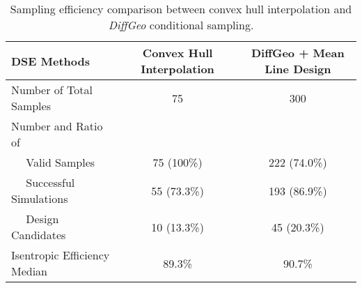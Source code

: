 \begin{table}[htbp]
  \centering
  \caption{Sampling efficiency comparison between convex hull interpolation and \textit{DiffGeo} conditional sampling.}
    \begin{tabular}{lcc}
    \hline
    DSE Methods & Convex Hull Interpolation & DiffGeo + Mean Line Design \\
    \hline
    Number of Total Samples & 75     & 300 \\
    \hline
    Number and Ratio of  &        &   \\
    $\quad$ Valid Samples & 75 (100\%) & 222 (74.0\%) \\
    $\quad$ Successful Simulations & 55 (73.3\%) & 193 (86.9\%) \\
    $\quad$ Design Candidates & 10 (13.3\%) & 45 (20.3\%) \\
    \hline
    Isentropic Efficiency Median & 89.3\% & 90.7\% \\
    \hline
    \end{tabular}%
  \label{ch6:tab:turbine_sample}%
\end{table}%